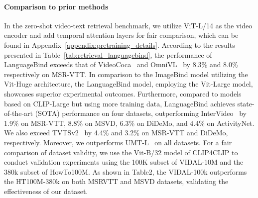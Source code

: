 \documentclass{article} \usepackage{iclr2024_conference,times}
\begin{document}
\paragraph{Comparison to prior methods} 
In the zero-shot video-text retrieval benchmark, we utilize ViT-L/14 as the video encoder and add temporal attention layers for fair comparison, which can be found in Appendix~\ref{appendix:pretraining_details}. According to the results presented in Table~\ref{tab:retrieval_languagebind}, the performance of LanguageBind exceeds that of VideoCoca~\citep{yan2022video} and OmniVL~\citep{wang2022omnivl} by 8.3\% and 8.0\% respectively on MSR-VTT. 
In comparison to the ImageBind model utilizing the Vit-Huge architecture, the LanguageBind model, employing the Vit-Large model, showcases superior experimental outcomes. Furthermore, compared to models based on CLIP-Large but using more training data, LanguageBind achieves state-of-the-art (SOTA) performance on four datasets, outperforming InterVideo~\citep{wang2022internvideo} by 1.9\% on MSR-VTT, 8.8\% on MSVD, 6.3\% on DiDeMo, and 4.4\% on ActivityNet. We also exceed TVTSv2~\citep{zeng2023tvtsv2} by 4.4\% and 3.2\% on MSR-VTT and DiDeMo, respectively. Moreover, we outperforms UMT-L~\citet{li2023unmasked} on all datasets. For a fair comparison of dataset validity, we use the Vit-B/32 model of CLIP4CLIP to conduct validation experiments using the 100K subset of VIDAL-10M and the 380k subset of HowTo100M. As shown in Table2, the VIDAL-100k outperforms the HT100M-380k on both MSRVTT and MSVD datasets, validating the effectiveness of our dataset.
\end{document}
